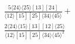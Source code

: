 \documentclass[varwidth, border=5pt]{standalone}
\begin{document}
\begin{my}
$\begin{gathered}
\scriptscriptstyle\frac{5⟨24⟩⟨25⟩[13][24]}{⟨12⟩[15][25]⟨34⟩⟨45⟩}+\\
\scriptscriptstyle\frac{2⟨24⟩⟨15⟩[13][12]⟨25⟩}{⟨12⟩[15][25]⟨34⟩⟨45⟩^2}\phantom{+}
\end{gathered}$
\end{my}
\end{document}
